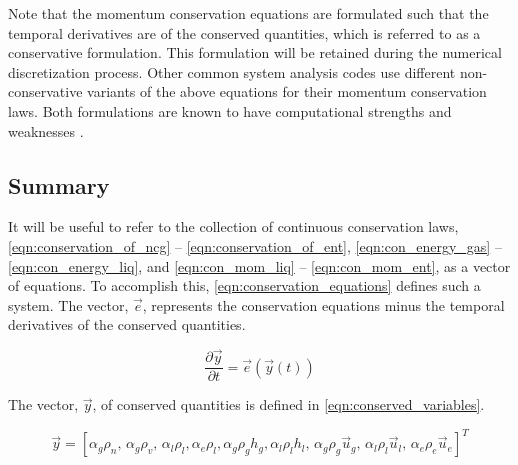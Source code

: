 Note that the momentum conservation equations are formulated such that the temporal derivatives are of the conserved quantities, which is referred to as a conservative formulation.
This formulation will be retained during the numerical discretization process.
Other common system analysis codes \cite{TRACE, RELAP} use different non-conservative variants of the above equations for their momentum conservation laws.
Both formulations are known to have computational strengths and weaknesses \cite{Park2009a}.

\subsection{Summary}
\label{subsect:summary}

It will be useful to refer to the collection of continuous conservation laws, \eqref{eqn:conservation_of_ncg} -- \eqref{eqn:conservation_of_ent}, \eqref{eqn:con_energy_gas} -- \eqref{eqn:con_energy_liq}, and \eqref{eqn:con_mom_liq} -- \eqref{eqn:con_mom_ent}, as a vector of equations.
To accomplish this, \eqref{eqn:conservation_equations} defines such a system.
The vector, $\vec{e}$, represents the conservation equations minus the temporal derivatives of the conserved quantities.

\begin{equation}
\label{eqn:conservation_equations}
\frac{\partial \vec{y} }{\partial t} = \vec{e}(\vec{y}(t))
\end{equation}

The vector, $\vec{y}$, of conserved quantities is defined in \eqref{eqn:conserved_variables}.

\begin{equation}
\label{eqn:conserved_variables}
\vec{y} = [\alpha_g \rho_n,\, \alpha_g \rho_v,\, \alpha_l \rho_l, \alpha_e \rho_l, \alpha_g \rho_g h_g, \alpha_l \rho_l h_l,\, \alpha_g \rho_g \vec{u}_g,\, \alpha_l \rho_l \vec{u}_l,\, \alpha_e \rho_e \vec{u}_e]^{T}
\end{equation}

